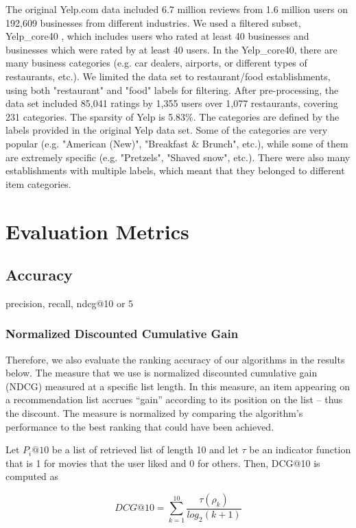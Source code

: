     The original Yelp.com data included 6.7 million reviews from 1.6 million users on 192,609 businesses from different industries. We used a filtered subset, Yelp\_core40 \cite{mansoury2019bias}, which includes users who rated at least 40 businesses and businesses which were rated by at least 40 users. In the Yelp\_core40, there are many business categories  (e.g. car dealers, airports, or different types of restaurants, etc.). We limited the data set to restaurant/food establishments, using both "restaurant" and "food" labels for filtering. After pre-processing, the data set included 85,041 ratings by 1,355 users over 1,077 restaurants, covering 231 categories. The sparsity of Yelp is 5.83\%. The categories are defined by the labels provided in the original Yelp data set. Some of the categories are very popular (e.g. "American (New)", "Breakfast \& Brunch", etc.), while some of them are extremely specific (e.g. "Pretzels", "Shaved snow", etc.). There were also many establishments with multiple labels, which meant that they belonged to different item categories. 


\section{Evaluation Metrics}
    \subsection{Accuracy}
    precision, recall, ndcg@10 or 5
        \subsubsection{Normalized Discounted Cumulative Gain}
        Therefore, we also evaluate the ranking accuracy of our algorithms in the results below. The measure that we use is normalized discounted cumulative gain (NDCG) measured at a specific list length. In this measure, an item appearing on a recommendation list accrues ``gain'' according to its position on the list -- thus the discount. The measure is normalized by comparing the algorithm's performance to the best ranking that could have been achieved. 

        Let $P_i@10$ be a list of retrieved list of length 10 and let $\tau$ be an indicator function that is 1 for movies that the user liked and 0 for others. Then, DCG@10 is computed as
        
        \begin{equation}
        DCG@10 = \sum_{k=1}^{10}{\frac{\tau(\rho_k)}{log_2(k+1)}}
        \end{equation}
        
